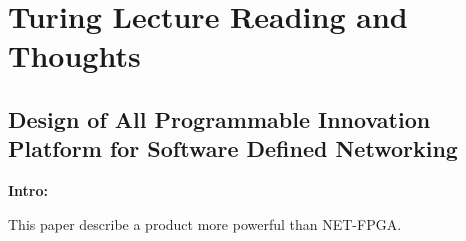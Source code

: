 %
%
%

\chapter{Turing Lecture Reading and Thoughts}
\label{intro} %


\section{Design of All Programmable Innovation Platform for Software Defined Networking}
\label{sec:1}
\textbf{Intro:}

This paper describe a product more powerful than NET-FPGA.
